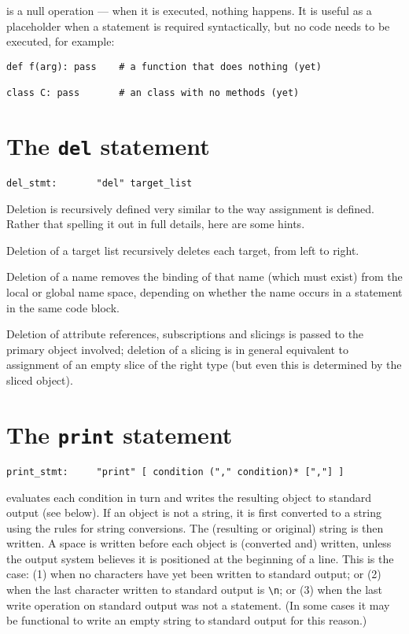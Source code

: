 \verb@pass@ is a null operation --- when it is executed, nothing
happens.  It is useful as a placeholder when a statement is
required syntactically, but no code needs to be executed, for example:

\begin{verbatim}
def f(arg): pass    # a function that does nothing (yet)

class C: pass       # an class with no methods (yet)
\end{verbatim}

\section{The {\tt del} statement}

\begin{verbatim}
del_stmt:       "del" target_list
\end{verbatim}

Deletion is recursively defined very similar to the way assignment is
defined. Rather that spelling it out in full details, here are some
hints.

Deletion of a target list recursively deletes each target, from left
to right.

Deletion of a name removes the binding of that name (which must exist)
from the local or global name space, depending on whether the name
occurs in a \verb@global@ statement in the same code block.

Deletion of attribute references, subscriptions and slicings
is passed to the primary object involved; deletion of a slicing
is in general equivalent to assignment of an empty slice of the
right type (but even this is determined by the sliced object).

\section{The {\tt print} statement} \label{print}

\begin{verbatim}
print_stmt:     "print" [ condition ("," condition)* [","] ]
\end{verbatim}

\verb@print@ evaluates each condition in turn and writes the resulting
object to standard output (see below).  If an object is not a string,
it is first converted to a string using the rules for string
conversions.  The (resulting or original) string is then written.  A
space is written before each object is (converted and) written, unless
the output system believes it is positioned at the beginning of a
line.  This is the case: (1) when no characters have yet been written
to standard output; or (2) when the last character written to standard
output is \verb/\n/; or (3) when the last write operation on standard
output was not a \verb@print@ statement.  (In some cases it may be
functional to write an empty string to standard output for this
reason.)

